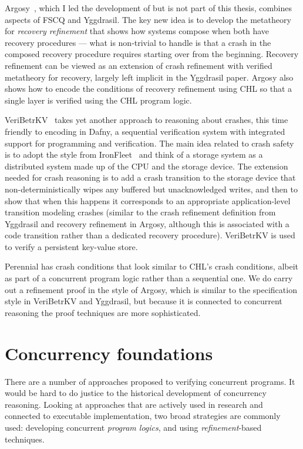 Argosy~\cite{chajed:argosy}, which I led the development of but is not part of
this thesis, combines aspects of FSCQ and Yggdrasil. The key new idea is to
develop the metatheory for \emph{recovery refinement} that shows how systems
compose when both have recovery procedures --- what is non-trivial to handle is
that a crash in the composed recovery procedure requires starting over from the
beginning. Recovery refinement can be viewed as an extension of crash refinement
with verified metatheory for recovery, largely left implicit in the Yggdrasil
paper. Argosy also shows how to encode the conditions of recovery refinement
using CHL so that a single layer is verified using the CHL program logic.

VeriBetrKV~\cite{hance:veribetrkv} takes yet another approach to reasoning about
crashes, this time friendly to encoding in Dafny, a sequential verification
system with integrated support for programming and verification. The main idea
related to crash safety is to adopt the style from
IronFleet~\cite{hawblitzel:ironfleet} and think of a storage system as a
distributed system made up of the CPU and the storage device. The extension
needed for crash reasoning is to add a crash transition to the storage device
that non-deterministically wipes any buffered but unacknowledged writes, and
then to show that when this happens it corresponds to an appropriate
application-level transition modeling crashes (similar to the crash refinement
definition from Yggdrasil and recovery refinement in Argosy, although this is
associated with a code transition rather than a dedicated recovery procedure).
VeriBetrKV is used to verify a persistent key-value store.

Perennial has crash conditions that look similar to CHL's crash conditions,
albeit as part of a concurrent program logic rather than a sequential one. We do
carry out a refinement proof in the style of Argosy, which is similar to the
specification style in VeriBetrKV and Yggdrasil, but because it is connected to
concurrent reasoning the proof techniques are more sophisticated.

\section{Concurrency foundations}

There are a number of approaches proposed to verifying concurrent programs. It
would be hard to do justice to the historical development of concurrency
reasoning. Looking at approaches that are actively used in research and
connected to executable implementation, two broad strategies are commonly used:
developing concurrent \emph{program logics}, and using \emph{refinement}-based
techniques.


